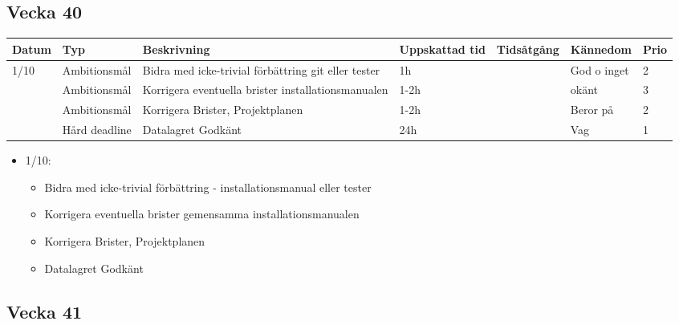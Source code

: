 \documentclass{TDP003mall}
\begin{document}
\newpage

\subsection{Vecka 40}
\begin{tabularx}{\linewidth}{|l|l|X|l|l|l|l|}
	\hline
	Datum & Typ           & Beskrivning                                         & Uppskattad tid & Tidsåtgång & Kännedom    & Prio \\ [0.5ex]
	\hline                                                      
	1/10  & Ambitionsmål  & Bidra med icke-trivial förbättring git eller tester & 1h             &            & God o inget & 2    \\
	\hline                                                      
          & Ambitionsmål  & Korrigera eventuella brister installationsmanualen  & 1-2h           &            & okänt       & 3    \\
	\hline                                                      
          & Ambitionsmål  & Korrigera Brister, Projektplanen                    & 1-2h           &            & Beror på    & 2    \\
	\hline                                                      
          & Hård deadline & Datalagret Godkänt                                  & 24h            &            & Vag         & 1    \\
	\hline
\end{tabularx}

\begin{itemize}
	\item 1/10: 
	\begin{itemize}
		\item Bidra med icke-trivial förbättring - installationsmanual eller tester
		\item Korrigera eventuella brister gemensamma installationsmanualen
		\item Korrigera Brister, Projektplanen
		\item Datalagret Godkänt
	\end{itemize}
\end{itemize}

\subsection{Vecka 41}
\end{document}

